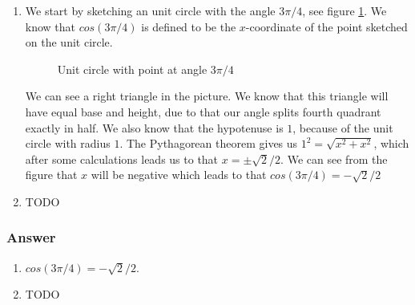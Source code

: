 \begin{enumerate}[label=(\alph*)]
  \item
    We start by sketching an unit circle with the angle $ 3\pi/4 $, see figure \ref{figure:checkpoint-1.1.18-a}. We know that $ cos(3\pi/4) $ is defined to be the $ x $-coordinate of the point sketched on the unit circle.

    \begin{figure}
      \centering
      \caption{Unit circle with point at angle $ 3\pi/4 $}
      \label{figure:checkpoint-1.1.18-a}
    \end{figure}

    We can see a right triangle in the picture. We know that this triangle will have equal base and height, due to that our angle splits fourth quadrant exactly in half. We also know that the hypotenuse is $ 1 $, because of the unit circle with radius $ 1 $. The Pythagorean theorem gives us $ 1^2 = \sqrt{x^2 + x^2} $, which after some calculations leads us to that $ x = \pm\sqrt{2}/2 $. We can see from the figure that $ x $ will be negative which leads to that $ cos(3\pi/4) = -\sqrt{2}/2 $
  \item
    TODO
\end{enumerate}

\subsubsection*{Answer}

\begin{enumerate}[label=(\alph*)]
  \item
    $ cos(3\pi/4) = -\sqrt{2}/2 $.
  \item
    TODO
\end{enumerate}
